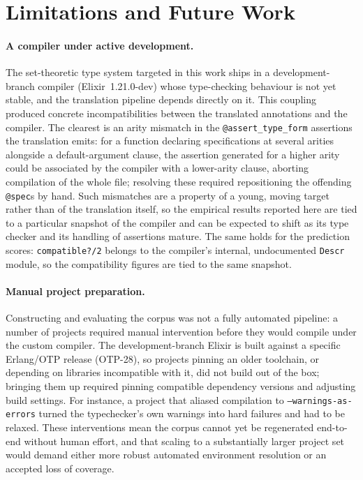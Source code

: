 \section{Limitations and Future Work}
\label{sec:future-work}

\paragraph{A compiler under active development.}
The set-theoretic type system targeted in this work ships in a development-branch compiler (Elixir~1.21.0-dev) whose type-checking behaviour is not yet stable, and the translation pipeline depends directly on it.
This coupling produced concrete incompatibilities between the translated annotations and the compiler.
The clearest is an arity mismatch in the \texttt{@assert\_type\_form} assertions the translation emits: for a function declaring specifications at several arities alongside a default-argument clause, the assertion generated for a higher arity could be associated by the compiler with a lower-arity clause, aborting compilation of the whole file; resolving these required repositioning the offending \texttt{@spec}s by hand.
Such mismatches are a property of a young, moving target rather than of the translation itself, so the empirical results reported here are tied to a particular snapshot of the compiler and can be expected to shift as its type checker and its handling of assertions mature.
The same holds for the prediction scores: \texttt{compatible?/2} belongs to the compiler's internal, undocumented \texttt{Descr} module, so the compatibility figures are tied to the same snapshot.

\paragraph{Manual project preparation.}
Constructing and evaluating the corpus was not a fully automated pipeline: a number of projects required manual intervention before they would compile under the custom compiler.
The development-branch Elixir is built against a specific Erlang/OTP release (OTP-28), so projects pinning an older toolchain, or depending on libraries incompatible with it, did not build out of the box; bringing them up required pinning compatible dependency versions and adjusting build settings.
For instance, a project that aliased compilation to \texttt{--warnings-as-errors} turned the typechecker's own warnings into hard failures and had to be relaxed.
These interventions mean the corpus cannot yet be regenerated end-to-end without human effort, and that scaling to a substantially larger project set would demand either more robust automated environment resolution or an accepted loss of coverage.

